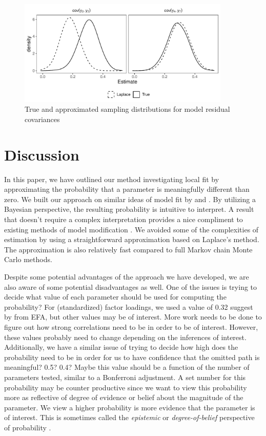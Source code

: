\documentclass[man, noextraspace, floatsintext, 12pt]{apa7}
\begin{document}
\begin{figure}
\centering
\includegraphics[width=0.9\textwidth]{fig/sampling_dist}
\caption{True and approximated sampling distributions for model residual covariances}
\label{fig:dist}
\end{figure}


\section{Discussion}

In this paper, we have outlined our method investigating local fit by approximating the probability that a parameter is meaningfully different than zero.
We built our approach on similar ideas of model fit by \textcite{Lee2016} and \textcite{Shi2019}.
By utilizing a Bayesian perspective, the resulting probability is intuitive to interpret.
A result that doesn't require a complex interpretation provides a nice compliment to existing methods of model modification \citep[e.g., ][]{Sorbom1989, Kaplan1989, Wald1943}.
We avoided some of the complexities of estimation by using a straightforward approximation based on Laplace's method.
The approximation is also relatively fast compared to full Markov chain Monte Carlo methods.

Despite some potential advantages of the approach we have developed, we are also aware of some potential disadvantages as well.
One of the issues is trying to decide what value of each parameter should be used for computing the probability? For (standardized) factor loadings, we used a value of 0.32 suggest by \textcite{Benson1998} from EFA, but other values may be of interest.
More work needs to be done to figure out how strong correlations need to be in order to be of interest.
However, these values probably need to change depending on the inferences of interest.
Additionally, we have a similar issue of trying to decide how high does the probability need to be in order for us to have confidence that the omitted path is meaningful? 0.5? 0.4? Maybe this value should be a function of the number of parameters tested, similar to a Bonferroni adjustment.
A set number for this probability may be counter productive since we want to view this probability more as reflective of degree of evidence or belief about the magnitude of the parameter.
We view a higher probability is more evidence that the parameter is of interest.
This is sometimes called the \textit{epistemic} or \textit{degree-of-belief} perspective of probability \citep[][, p.XX]{Levy2016, deFinetti1974}.
\end{document}
